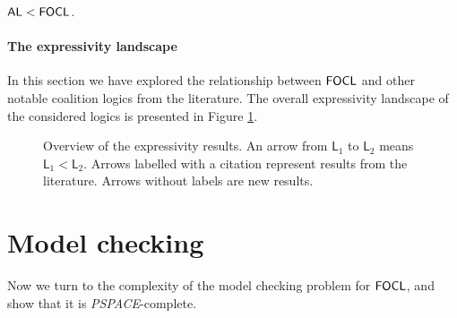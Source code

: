 \documentclass[sigconf,anonymous]{aamas}
\begin{document}
\begin{proposition}
\label{alVScsl}
    $\mathsf{AL} < \mathsf{FOCL}$.
\end{proposition}



\paragraph{The expressivity landscape}
In this section we have explored the relationship between $\mathsf{FOCL}$ and other notable coalition logics from the literature. The overall expressivity landscape of the considered logics is presented in Figure \ref{fig:expressivity}.

\begin{figure}[h!]
\centering
{}
\caption{Overview of the expressivity results. An arrow from $\mathsf{L}_1$ to $\mathsf{L}_2$ means $\mathsf{L}_1 <\mathsf{L}_2$. Arrows labelled with a citation represent results from the literature. Arrows without labels are new results.}
\label{fig:expressivity}
\end{figure}

\section{Model checking}
\label{sec:mc}
Now we turn to the complexity of the model checking problem for $\mathsf{FOCL}$, and show that %
it is \textit{PSPACE}-complete.
\end{document}
